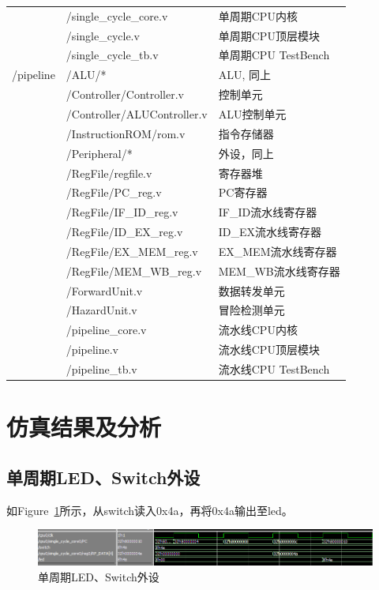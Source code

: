 \documentclass{article}
\begin{document}
\begin{longtable}{l|ll}
                & /single\_cycle\_core.v & 单周期CPU内核 \\
                & /single\_cycle.v & 单周期CPU顶层模块 \\
                & /single\_cycle\_tb.v & 单周期CPU TestBench \\
                \midrule
                /pipeline & /ALU/* & ALU, 同上 \\
                & /Controller/Controller.v & 控制单元 \\
                & /Controller/ALUController.v & ALU控制单元 \\
                & /InstructionROM/rom.v & 指令存储器 \\
                & /Peripheral/* & 外设，同上 \\
                & /RegFile/regfile.v & 寄存器堆 \\
                & /RegFile/PC\_reg.v & PC寄存器 \\
                & /RegFile/IF\_ID\_reg.v & IF\_ID流水线寄存器 \\
                & /RegFile/ID\_EX\_reg.v & ID\_EX流水线寄存器 \\
                & /RegFile/EX\_MEM\_reg.v & EX\_MEM流水线寄存器 \\
                & /RegFile/MEM\_WB\_reg.v & MEM\_WB流水线寄存器 \\
                & /ForwardUnit.v & 数据转发单元 \\
                & /HazardUnit.v & 冒险检测单元 \\
                & /pipeline\_core.v & 流水线CPU内核 \\
                & /pipeline.v & 流水线CPU顶层模块 \\
                & /pipeline\_tb.v & 流水线CPU TestBench \\
            \end{longtable}

    \section{仿真结果及分析}
        \subsection{单周期LED、Switch外设}
            如Figure~\ref{fig:singlecycle_ledswitch}所示，从switch读入0x4a，再将0x4a输出至led。
            \begin{figure}[H]
                \centering
                \includegraphics[width=\textwidth]{images/singlecycle_ledswitch.png}
                \caption{\label{fig:singlecycle_ledswitch}单周期LED、Switch外设}
            \end{figure}
\end{document}
